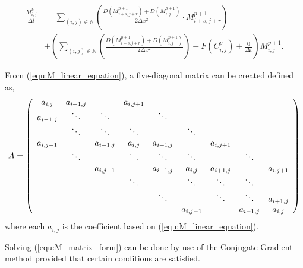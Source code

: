 \begin{equation} \label{equ:M_linear_equation}
\begin{aligned}
  \frac{M^{k}_{i,j}}{\Delta t} &= 
  \sum_{(i,j) \in \mathbb{A}} \left( \frac{D(M^{p+1}_{i+s,j+r}) + D(M^{p+1}_{i,j})} 
    {2\Delta x^2} \cdot M^{p+1}_{i+s, j+r} \right) \\
  & +\left( \sum_{(i,j) \in \mathbb{A}} \left( \frac{ D(M^{p+1}_{i+s,j+r}) + D(M^{p+1}_{i,j})} 
    {2\Delta x^2} \right) - F(C^{p}_{i,j}) + \frac{0}{\Delta t} \right) M^{p+1}_{i,j}.
\end{aligned}
\end{equation} 

From (\ref{equ:M_linear_equation}), a five-diagonal matrix can be created defined as,
\begin{equation} \label{equ:M_matrix_form}
  A = 
    \left( 
      \begin{array}{c c c c c c c c c c}
        a_{i,j} & a_{i+1,j} &  & a_{i,j+1} &   \\
        a_{i-1,j} & \ddots & \ddots &   &  \ddots &   \\
        & \ddots & \ddots & \ddots & & \ddots & \\
        a_{i,j-1} &  & a_{i-1,j} & a_{i,j} & a_{i+1,j} &   &  a_{i,j+1} &   \\
        & \ddots & & \ddots & \ddots & \ddots & & \ddots\\
        & & a_{i,j-1} &  & a_{i-1,j} & a_{i,j} & a_{i+1,j} &  & a_{i,j+1} \\
        & & & \ddots & & \ddots & \ddots & \ddots & \\
        & & & & \ddots & & \ddots & \ddots & a_{i+1,j} \\
        & & & & & a_{i,j-1} & & a_{i-1,j} & a_{i,j}
      \end{array}
    \right)
\end{equation}
where each $a_{i,j}$ is the coefficient based on (\ref{equ:M_linear_equation}). 

Solving (\ref{equ:M_matrix_form}) can be done by use of the Conjugate Gradient method provided that certain conditions are satisfied.

